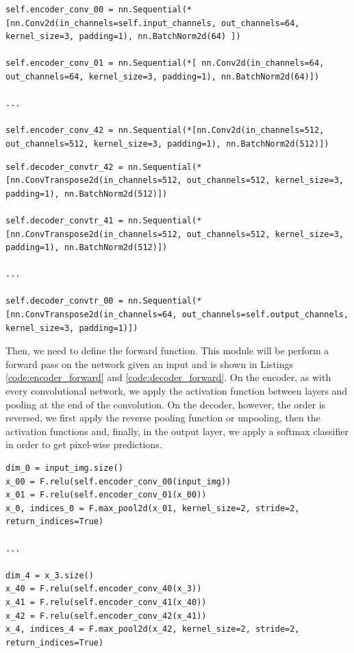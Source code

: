 \begin{lstlisting}[style=Python-color, caption=First layers of the SegNet encoder, frame=single, label=code:encoder]
self.encoder_conv_00 = nn.Sequential(*[nn.Conv2d(in_channels=self.input_channels, out_channels=64, kernel_size=3, padding=1), nn.BatchNorm2d(64) ])

self.encoder_conv_01 = nn.Sequential(*[ nn.Conv2d(in_channels=64, out_channels=64, kernel_size=3, padding=1), nn.BatchNorm2d(64)])

...

self.encoder_conv_42 = nn.Sequential(*[nn.Conv2d(in_channels=512, out_channels=512, kernel_size=3, padding=1), nn.BatchNorm2d(512)])
\end{lstlisting}

\begin{lstlisting}[style=Python-color, caption=First layers of the SegNet decoder, frame=single, label=code:decoder]
self.decoder_convtr_42 = nn.Sequential(*[nn.ConvTranspose2d(in_channels=512, out_channels=512, kernel_size=3, padding=1), nn.BatchNorm2d(512)])

self.decoder_convtr_41 = nn.Sequential(*[nn.ConvTranspose2d(in_channels=512, out_channels=512, kernel_size=3, padding=1), nn.BatchNorm2d(512)])

...

self.decoder_convtr_00 = nn.Sequential(*[nn.ConvTranspose2d(in_channels=64, out_channels=self.output_channels, kernel_size=3, padding=1)])

\end{lstlisting}

Then, we need to define the forward function. This module will be perform a forward pass on the network given an input and is shown in Listings \ref{code:encoder_forward} and \ref{code:decoder_forward}. On the encoder, as with every convolutional network, we apply the activation function between layers and pooling at the end of the convolution. On the decoder, however, the order is reversed, we first apply the reverse pooling function or unpooling, then the activation functions and, finally, in the output layer, we apply a softmax classifier in order to get pixel-wise predictions.

\begin{lstlisting}[style=Python-color, caption=Forward function on the encoder, frame=single, label=code:encoder_forward]
dim_0 = input_img.size()
x_00 = F.relu(self.encoder_conv_00(input_img))
x_01 = F.relu(self.encoder_conv_01(x_00))
x_0, indices_0 = F.max_pool2d(x_01, kernel_size=2, stride=2, return_indices=True)

...

dim_4 = x_3.size()
x_40 = F.relu(self.encoder_conv_40(x_3))
x_41 = F.relu(self.encoder_conv_41(x_40))
x_42 = F.relu(self.encoder_conv_42(x_41))
x_4, indices_4 = F.max_pool2d(x_42, kernel_size=2, stride=2, return_indices=True)

\end{lstlisting}

